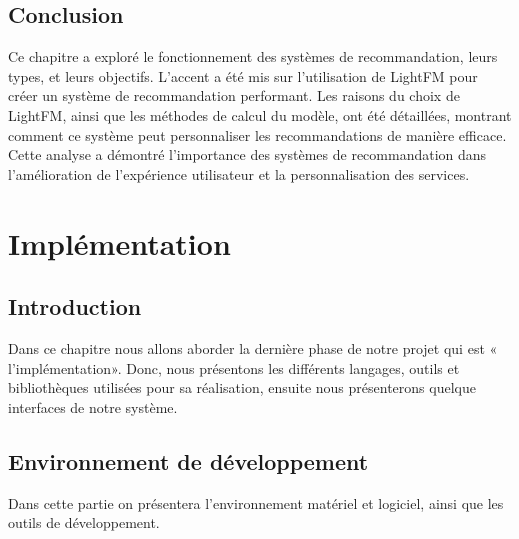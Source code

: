 \documentclass[edit,12pt,a4paper,ChapStyle,oneside,doubleinterligne]{report}
\begin{document}
\section{Conclusion}
Ce chapitre a exploré le fonctionnement des systèmes de recommandation, leurs types, et leurs objectifs. L'accent a été mis sur l'utilisation de LightFM pour créer un système de recommandation performant. Les raisons du choix de LightFM, ainsi que les méthodes de calcul du modèle, ont été détaillées, montrant comment ce système peut personnaliser les recommandations de manière efficace. Cette analyse a démontré l'importance des systèmes de recommandation dans l'amélioration de l'expérience utilisateur et la personnalisation des services.


\chapter{Implémentation}
\section{Introduction}
Dans ce chapitre nous allons aborder la dernière phase de notre projet qui est « l’implémentation». Donc, nous présentons les différents langages, outils et bibliothèques utilisées pour sa réalisation, ensuite nous présenterons quelque interfaces de notre système.
\section{Environnement de développement }
Dans cette partie on présentera l'environnement matériel et logiciel, ainsi que les outils de développement. 
\end{document}
